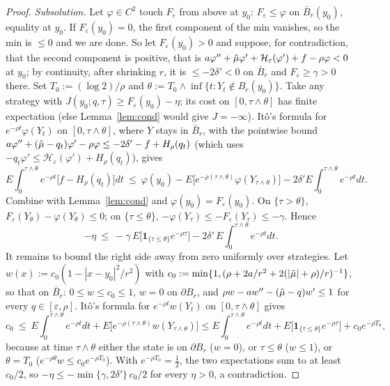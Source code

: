 \begin{proof}
\emph{Subsolution.} Let $\varphi\in C^2$ touch $F_\varepsilon$ from above at $y_0$: $F_\varepsilon\le\varphi$ on $\bar B_r(y_0)$, equality at $y_0$. If $F_\varepsilon(y_0)=0$, the first component of the min vanishes, so the min is $\le0$ and we are done. So let $F_\varepsilon(y_0)>0$ and suppose, for contradiction, that the second component is positive, that is $a\varphi''+\tilde\mu\varphi'+\mathcal H_\varepsilon(\varphi')+f-\rho\varphi<0$ at $y_0$; by continuity, after shrinking $r$, it is $\le-2\delta'<0$ on $\bar B_r$ and $F_\varepsilon\ge\gamma>0$ there. Set $T_0:=(\log2)/\rho$ and $\theta:=T_0\wedge\inf\{t:Y_t\notin B_r(y_0)\}$. Take any strategy with $J(y_0;q,\tau)\ge F_\varepsilon(y_0)-\eta$; its cost on $[0,\tau\wedge\theta]$ has finite expectation (else Lemma~\ref{lem:cond} would give $J=-\infty$). It\^o's formula for $e^{-\rho t}\varphi(Y_t)$ on $[0,\tau\wedge\theta]$, where $Y$ stays in $\bar B_r$, with the pointwise bound $a\varphi''+(\tilde\mu-q_t)\varphi'-\rho\varphi\le-2\delta'-f+H_\rho(q_t)$ (which uses $-q_t\varphi'\le\mathcal H_\varepsilon(\varphi')+H_\rho(q_t)$), gives
\[
E\int_0^{\tau\wedge\theta}e^{-\rho t}\big[f-H_\rho(q_t)\big]dt\ \le\ \varphi(y_0)-E\big[e^{-\rho(\tau\wedge\theta)}\varphi(Y_{\tau\wedge\theta})\big]-2\delta'E\int_0^{\tau\wedge\theta}e^{-\rho t}dt .
\]
Combine with Lemma~\ref{lem:cond} and $\varphi(y_0)=F_\varepsilon(y_0)$. On $\{\tau>\theta\}$, $F_\varepsilon(Y_\theta)-\varphi(Y_\theta)\le0$; on $\{\tau\le\theta\}$, $-\varphi(Y_\tau)\le-F_\varepsilon(Y_\tau)\le-\gamma$. Hence
\[
-\eta\ \le\ -\gamma\,E\big[\mathbf 1_{\{\tau\le\theta\}}e^{-\rho\tau}\big]-2\delta'\,E\int_0^{\tau\wedge\theta}e^{-\rho t}dt .
\]
It remains to bound the right side away from zero uniformly over strategies. Let $w(x):=c_0(1-|x-y_0|^2/r^2)$ with $c_0:=\min\{1,(\rho+2a/r^2+2(|\tilde\mu|+\rho)/r)^{-1}\}$, so that on $\bar B_r$: $0\le w\le c_0\le1$, $w=0$ on $\partial B_r$, and $\rho w-aw''-(\tilde\mu-q)w'\le1$ for every $q\in[\varepsilon,\rho]$. It\^o's formula for $e^{-\rho t}w(Y_t)$ on $[0,\tau\wedge\theta]$ gives
\[
c_0\ \le\ E\int_0^{\tau\wedge\theta}e^{-\rho t}dt+E\big[e^{-\rho(\tau\wedge\theta)}w(Y_{\tau\wedge\theta})\big]
\le E\int_0^{\tau\wedge\theta}e^{-\rho t}dt+E\big[\mathbf 1_{\{\tau\le\theta\}}e^{-\rho\tau}\big]+c_0e^{-\rho T_0},
\]
because at time $\tau\wedge\theta$ either the state is on $\partial B_r$ ($w=0$), or $\tau\le\theta$ ($w\le1$), or $\theta=T_0$ ($e^{-\rho\theta}w\le c_0e^{-\rho T_0}$). With $e^{-\rho T_0}=\tfrac12$, the two expectations sum to at least $c_0/2$, so $-\eta\le-\min\{\gamma,2\delta'\}\,c_0/2$ for every $\eta>0$, a contradiction.
\end{proof}

